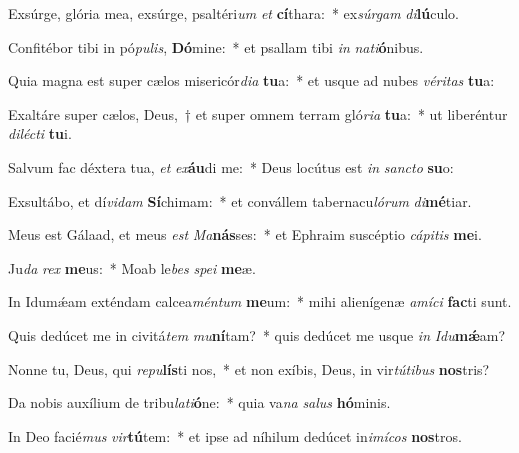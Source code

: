 \item Exsúrge, glória mea, exsúrge, psaltéri\textit{um} \textit{et} \textbf{cí}thara:~* ex\textit{súr}\textit{gam} \textit{di}\textbf{lú}culo.
\item Confitébor tibi in pó\textit{pu}\textit{lis}, \textbf{Dó}mine:~* et psallam tibi \textit{in} \textit{na}\textit{ti}\textbf{ó}nibus.
\item Quia magna est super cælos misericór\textit{di}\textit{a} \textbf{tu}a:~* et usque ad nubes \textit{vé}\textit{ri}\textit{tas} \textbf{tu}a:
\item Exaltáre super cælos, Deus,~† et super omnem terram gló\textit{ri}\textit{a} \textbf{tu}a:~* ut liberéntur \textit{di}\textit{léc}\textit{ti} \textbf{tu}i.
\item Salvum fac déxtera tua, \textit{et} \textit{ex}\textbf{áu}di me:~* Deus locútus est \textit{in} \textit{sanc}\textit{to} \textbf{su}o:
\item Exsultábo, et dí\textit{vi}\textit{dam} \textbf{Sí}chimam:~* et convállem tabernacu\textit{ló}\textit{rum} \textit{di}\textbf{mé}tiar.
\item Meus est Gálaad, et meus \textit{est} \textit{Ma}\textbf{nás}ses:~* et Ephraim suscéptio \textit{cá}\textit{pi}\textit{tis} \textbf{me}i.
\item Ju\textit{da} \textit{rex} \textbf{me}us:~* Moab le\textit{bes} \textit{spe}\textit{i} \textbf{me}æ.
\item In Idumǽam exténdam calcea\textit{mén}\textit{tum} \textbf{me}um:~* mihi alienígenæ \textit{a}\textit{mí}\textit{ci} \textbf{fac}ti sunt.
\item Quis dedúcet me in civitá\textit{tem} \textit{mu}\textbf{ní}tam?~* quis dedúcet me usque \textit{in} \textit{I}\textit{du}\textbf{mǽ}am?
\item Nonne tu, Deus, qui \textit{re}\textit{pu}\textbf{lís}ti nos,~* et non exíbis, Deus, in vir\textit{tú}\textit{ti}\textit{bus} \textbf{nos}tris?
\item Da nobis auxílium de tribu\textit{la}\textit{ti}\textbf{ó}ne:~* quia va\textit{na} \textit{sa}\textit{lus} \textbf{hó}minis.
\item In Deo facié\textit{mus} \textit{vir}\textbf{tú}tem:~* et ipse ad níhilum dedúcet in\textit{i}\textit{mí}\textit{cos} \textbf{nos}tros.
